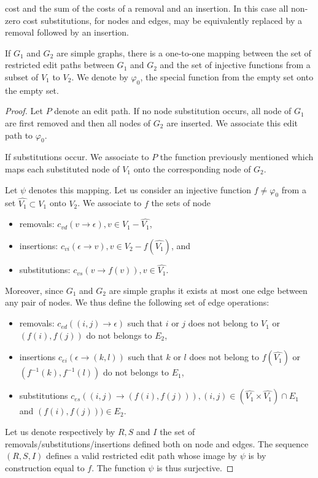 cost and the sum of the costs of a removal and an insertion. In this
case all non-zero cost substitutions, for nodes and edges, may be equivalently
replaced by a removal followed by an insertion.
\begin{proposition}\label{prop:edit_path_mapping}
  If $G_1$ and $G_2$ are simple graphs, there is a one-to-one mapping
  between the set of restricted edit paths between $G_1$ and $G_2$ and
  the set of injective functions from a subset of $V_1$ to $V_2$. We
  denote by $\varphi_0$, the special function from the empty set onto
  the empty set.
\end{proposition}
\begin{proof}
  Let $P$ denote an edit path. If no node substitution occurs, all
  node of $G_1$ are first removed and then all nodes of $G_2$
  are inserted. We associate this edit path to $\varphi_0$. 

  If substitutions occur. We associate to $P$ the function previously
  mentioned which maps each substituted node of $V_1$ onto the
  corresponding node of $G_2$. 

  Let $\psi$ denotes this mapping. Let us consider an injective
  function $f\neq \varphi_0$ from a set $\hat{V_1}\subset V_1$ onto $V_2$.  We
  associate to $f$ the sets of node
  \begin{itemize}
  \item removals: $c_{vd}(v\rightarrow \epsilon), v\in V_1-\hat{V_1}$,
  \item insertions:  $c_{vi}(\epsilon\rightarrow v), v\in V_2-f(\hat{V_1})$, and
  \item substitutions: $c_{vs}(v\rightarrow f(v)), v\in \hat{V_1}$.   
  \end{itemize}
  Moreover, since $G_1$ and $G_2$ are simple graphs it exists at most
  one edge between any pair of nodes. We thus define the following
  set of edge operations:
  \begin{itemize}
  \item removals: $c_{ed}((i,j)\rightarrow \epsilon)$ such that $i$ or $j$ does not belong to $\hat{V_1}$ or $(f(i),f(j))$ do not belongs to $E_2$,
  \item insertions $c_{ei}(\epsilon \rightarrow (k,l) )$ such that $k$ or $l$ does not belong to $f(\hat{V_1})$ or $(f^{-1}(k),f^{-1}(l))$ do not belongs to $E_1$,

  \item substitutions $c_{es}((i,j)\rightarrow (f(i),f(j))), (i,j)\in (\hat{V_1}\times\hat{V_1})\cap E_1$ and $(f(i),f(j)))\in E_2$.
  \end{itemize}
  Let us denote respectively by $R,S$ and $I$ the set of
  removals/substitutions/insertions defined both on node and
  edges. The sequence $(R,S,I)$ defines a valid restricted edit path whose image
  by $\psi$ is by construction equal to $f$. The function $\psi$ is
  thus surjective.


\end{proof}
